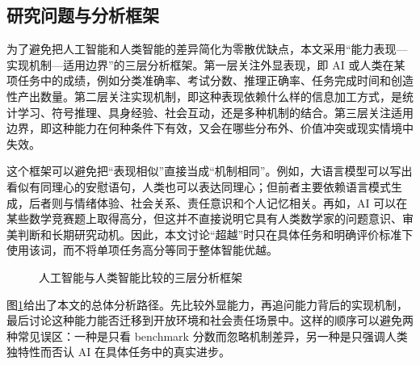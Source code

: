 \documentclass[UTF8,zihao=5,a4paper]{ctexart}
\begin{document}
\subsection{研究问题与分析框架}

为了避免把人工智能和人类智能的差异简化为零散优缺点，本文采用“能力表现—实现机制—适用边界”的三层分析框架。第一层关注外显表现，即 AI 或人类在某项任务中的成绩，例如分类准确率、考试分数、推理正确率、任务完成时间和创造性产出数量。第二层关注实现机制，即这种表现依赖什么样的信息加工方式，是统计学习、符号推理、具身经验、社会互动，还是多种机制的结合。第三层关注适用边界，即这种能力在何种条件下有效，又会在哪些分布外、价值冲突或现实情境中失效。

这个框架可以避免把“表现相似”直接当成“机制相同”。例如，大语言模型可以写出看似有同理心的安慰语句，人类也可以表达同理心；但前者主要依赖语言模式生成，后者则与情绪体验、社会关系、责任意识和个人记忆相关。再如，AI 可以在某些数学竞赛题上取得高分，但这并不直接说明它具有人类数学家的问题意识、审美判断和长期研究动机。因此，本文讨论“超越”时只在具体任务和明确评价标准下使用该词，而不将单项任务高分等同于整体智能优越。

\begin{figure}[htbp]
\centering
{}
\caption{人工智能与人类智能比较的三层分析框架}
\label{fig:ai_human_framework}
\end{figure}

图\ref{fig:ai_human_framework}给出了本文的总体分析路径。先比较外显能力，再追问能力背后的实现机制，最后讨论这种能力能否迁移到开放环境和社会责任场景中。这样的顺序可以避免两种常见误区：一种是只看 benchmark 分数而忽略机制差异，另一种是只强调人类独特性而否认 AI 在具体任务中的真实进步。
\end{document}
